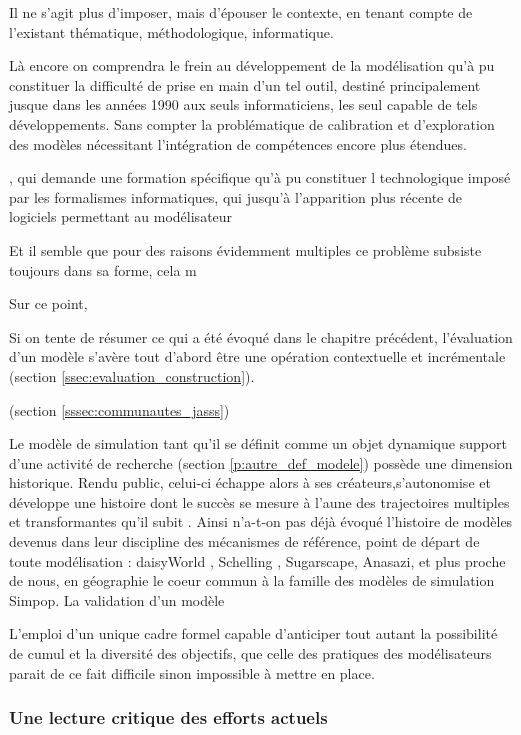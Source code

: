 Il ne s'agit plus d'imposer, mais d'épouser le contexte, en tenant compte de l'existant thématique, méthodologique, informatique.



Là encore on comprendra le frein au développement de la modélisation qu'à pu constituer la difficulté de prise en main d'un tel outil, destiné principalement jusque dans les années 1990 aux seuls informaticiens, les seul capable de tels développements. Sans compter la problématique de calibration et d'exploration des modèles nécessitant l'intégration de compétences encore plus étendues.

 , qui demande une formation spécifique qu'à pu constituer l technologique imposé par les formalismes informatiques, qui jusqu'à l'apparition plus récente de logiciels permettant au modélisateur



Et il semble que pour des raisons évidemment multiples ce problème subsiste toujours dans sa forme, cela m

Sur ce point, 

Si on tente de résumer ce qui a été évoqué dans le chapitre précédent, l'évaluation d'un modèle s'avère tout d'abord être une opération contextuelle  et incrémentale (section \ref{ssec:evaluation_construction}). 


(section \ref{sssec:communautes_jasss}) 



Le modèle de simulation tant qu'il se définit comme un objet dynamique support d'une activité de recherche (section \ref{p:autre_def_modele}) possède une dimension historique. Rendu public, celui-ci échappe alors à ses créateurs,s'autonomise et développe une histoire dont le succès se mesure à l'aune des trajectoires multiples et transformantes qu'il subit \autocite{Banos2013a}. Ainsi n'a-t-on pas déjà évoqué l'histoire de modèles devenus dans leur discipline des mécanismes de référence, point de départ de toute modélisation : daisyWorld \autocite{Dutreuil2013}, Schelling \autocite {Bulle2005}, Sugarscape, Anasazi, et plus proche de nous, en géographie le coeur commun à la famille des modèles de simulation Simpop. La validation d'un modèle 

L'emploi d'un unique cadre formel capable d'anticiper tout autant la possibilité de cumul et la diversité des objectifs, que celle des pratiques des modélisateurs parait de ce fait difficile sinon impossible à mettre en place.

\subsubsection{Une lecture critique des efforts actuels}

